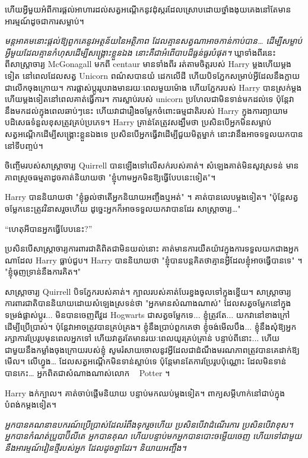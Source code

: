 ហើយ​អ្វី​មួយ​អំពី​ការ​ផ្តល់​អាហារ​ដល់​សត្វ​អណ្តើក​នូវ​ដុំ​ស្ករ​ដែល​ស្រោប​ដោយ​ថ្នាំ​ងងុយគេង​នៅ​តែ​មាន​អារម្មណ៍​ដូច​ជា​ការ​សម្លាប់។

\emph{មន្តអាគមនោះផ្តល់ឱ្យពួកគេនូវអត្ថន័យនៃអត្ថិភាព ដែលគ្មានសត្វណាអាចកាន់កាប់បាន… ដើម្បីសម្លាប់អ្វីមួយដែលគ្មានកំហុសដើម្បីសង្គ្រោះខ្លួនឯង នោះគឺជាអំពើបាបដ៏ធ្ងន់ធ្ងរបំផុត។} ឃ្លាទាំងពីរនេះពីសាស្រ្តាចារ្យ McGonagall មកពី centaur មានទាំងពីរ រត់តាមចិត្តរបស់ Harry ម្តងហើយម្តងទៀត នៅពេលដែលសត្វ Unicorn ពណ៌សបានយំ ដេកលើដី ហើយបិទភ្នែកសម្រាប់អ្វីដែលនឹងក្លាយជាលើកចុងក្រោយ។ ការផ្លាស់ប្តូររូបរាងមានរយៈពេលមួយម៉ោង ហើយភ្នែករបស់ Harry បានស្រក់ម្តងហើយម្តងទៀតនៅពេលគាត់ធ្វើការ។ ការស្លាប់របស់ unicorn ប្រហែលជាមិនទាន់មកដល់ទេ ប៉ុន្តែវានឹងមកដល់ក្នុងពេលឆាប់ៗនេះ ហើយវាជារឿងចម្លែកចំពោះធម្មជាតិរបស់ Harry ក្នុងការព្យាយាមបដិសេធទំនួលខុសត្រូវគ្រប់ប្រភេទ។ Harry គ្រាន់តែត្រូវសង្ឃឹមថា ប្រសិនបើអ្នកមិនសម្លាប់សត្វអណ្តើកដើម្បីសង្គ្រោះខ្លួនឯងទេ ប្រសិនបើអ្នកធ្វើវាដើម្បីជួយមិត្តម្នាក់ នោះវានឹងអាចទទួលយកបាននៅទីបញ្ចប់។

ចិញ្ចើមរបស់សាស្រ្តាចារ្យ Quirrell បានឡើងទៅលើសក់របស់គាត់។ សំឡេង​គាត់​មិនសូវ​ស្រទន់ មាន​ភាព​ស្រួច​ធម្មតា​ដូច​គាត់​និយាយ​ថា "ខ្ញុំ​ហាម​អ្នក​មិន​ឱ្យ​ធ្វើ​បែប​នេះ​ទៀត"។

Harry បាននិយាយថា "ខ្ញុំឆ្ងល់ថាតើអ្នកនិយាយអញ្ចឹងឬអត់" ។ គាត់បានលេបម្តងទៀត។ "ប៉ុន្តែសត្វចម្លែកនេះត្រូវវិនាសរួចហើយ ដូច្នេះអ្នកក៏អាចទទួលយកវាបានដែរ សាស្រ្តាចារ្យ…"

“ហេតុអីបានអ្នកធ្វើបែបនេះ?”

ប្រសិនបើ​សាស្ត្រាចារ្យ​ការពារជាតិ​ពិតជា​មិន​យល់​នោះ គាត់​មាន​ការ​យឺតយ៉ាវ​ក្នុង​ការ​ទទួល​យក​ជាង​អ្នក​ណា​ដែល Harry ធ្លាប់​ជួប។ Harry បាននិយាយថា "ខ្ញុំបានបន្តគិតថាគ្មានអ្វីដែលខ្ញុំអាចធ្វើបានទេ" ។ "ខ្ញុំធុញទ្រាន់នឹងការគិត។"

សាស្រ្តាចារ្យ Quirrell បិទភ្នែករបស់គាត់។ ក្បាលរបស់គាត់បែរខ្នងចូលទៅក្នុងខ្នើយ។ សាស្ត្រាចារ្យការពារជាតិបាននិយាយដោយសំឡេងស្រទន់ថា "អ្នកមានសំណាងណាស់" ដែលសត្វចម្លែកនៅក្នុងទម្រង់ផ្លាស់ប្តូរ... មិនបានចេញពីវួដ Hogwarts ជាសត្វចម្លែកទេ... ខ្ញុំត្រូវតែ... យកវានៅខាងក្រៅដើម្បីប្រើប្រាស់។ ប៉ុន្តែវាអាចត្រូវបានគ្រប់គ្រង។ ខ្ញុំនឹងប្រាប់ពួកគេថា ខ្ញុំចង់មើលបឹង... ខ្ញុំនឹងសុំឱ្យអ្នករក្សាការប្រែរូបមុនពេលអ្នកទៅ ហើយវាគួរតែមានរយៈពេលយូរគ្រប់គ្រាន់ បន្ទាប់ពីនោះ... ហើយជាមួយនឹងកម្លាំងចុងក្រោយរបស់ខ្ញុំ សូមរំសាយចោលនូវអ្វីដែលជាដំណឹងមរណភាពត្រូវបានគេដាក់ឱ្យមើល។ លើហ្វូង… ដែលសត្វអណ្តើកមិនទាន់ស្លាប់ទេ ប៉ុន្តែមានតែការប្រែរូបប៉ុណ្ណោះ ដែលមិនទាន់បានកេះ… អ្នកពិតជាសំណាងណាស់លោក ~ Potter ។

Harry ងក់ក្បាល។ គាត់ចាប់ផ្តើមនិយាយ បន្ទាប់មកឈប់ម្តងទៀត។ ពាក្យ​សម្ដី​ហាក់​នៅ​ជាប់​ក្នុង​បំពង់ក​ម្ដង​ទៀត។

\emph{អ្នកបានគណនាឧបករណ៍ប្រើប្រាស់ដែលរំពឹងទុករួចហើយ ប្រសិនបើវាដំណើរការ ប្រសិនបើវាខុស។ អ្នកបានកំណត់ប្រូបាប៊ីលីតេ អ្នកបានគុណ ហើយបន្ទាប់មកអ្នកបានបោះចម្លើយចេញ ហើយទៅជាមួយនឹងអារម្មណ៍វៀនថ្មីរបស់អ្នក ដែលដូចគ្នាដែរ។ និយាយអញ្ចឹង។}

